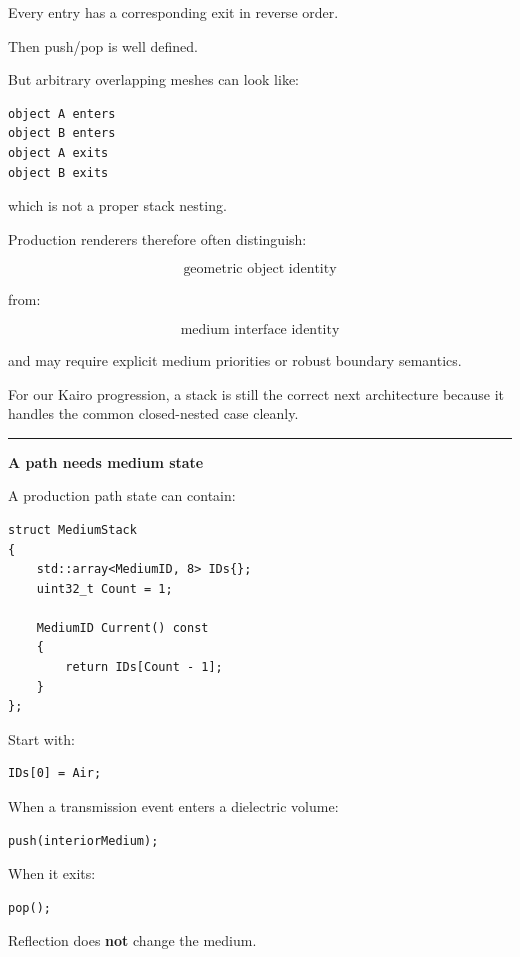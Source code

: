 Every entry has a corresponding exit in reverse order.

Then push/pop is well defined.

But arbitrary overlapping meshes can look like:

\begin{verbatim}
object A enters
object B enters
object A exits
object B exits
\end{verbatim}

which is not a proper stack nesting.

Production renderers therefore often distinguish:

\[
\text{geometric object identity}
\]

from:

\[
\text{medium interface identity}
\]

and may require explicit medium priorities or robust boundary semantics.

For our Kairo progression, a stack is still the correct next architecture because it handles the common closed-nested case cleanly.

\begin{center}\rule{0.5\linewidth}{0.5pt}\end{center}

\textbf{A path needs medium state}

A production path state can contain:

\begin{verbatim}
struct MediumStack
{
    std::array<MediumID, 8> IDs{};
    uint32_t Count = 1;

    MediumID Current() const
    {
        return IDs[Count - 1];
    }
};
\end{verbatim}

Start with:

\begin{verbatim}
IDs[0] = Air;
\end{verbatim}

When a transmission event enters a dielectric volume:

\begin{verbatim}
push(interiorMedium);
\end{verbatim}

When it exits:

\begin{verbatim}
pop();
\end{verbatim}

Reflection does \textbf{not} change the medium.

